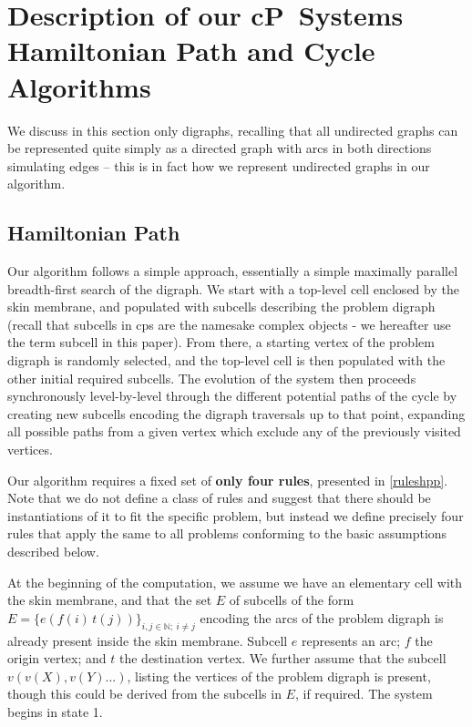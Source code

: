 \section{\label{sect:algohpp}Description of our cP~Systems Hamiltonian Path and Cycle Algorithms}
We discuss in this section only digraphs, recalling that all undirected graphs can be represented quite simply as a directed graph with arcs in both directions simulating edges -- this is in fact how we represent undirected graphs in our algorithm.

\subsection{Hamiltonian Path}
Our algorithm follows a simple approach, essentially a simple maximally parallel breadth-first search of the digraph.  We start with a top-level cell enclosed by the skin membrane, and populated with subcells describing the problem digraph (recall that subcells in \gls{cps} are the namesake complex objects - we hereafter use the term subcell in this paper).  From there, a starting vertex of the problem digraph is randomly selected, and the top-level cell is then populated with the other initial required subcells.  The evolution of the system then proceeds synchronously level-by-level through the different potential paths of the cycle by creating new subcells encoding the digraph traversals up to that point, expanding all possible paths from a given vertex which exclude any of the previously visited vertices.

Our algorithm requires a fixed set of \textbf{only four rules}, presented in \autoref{ruleshpp}.  Note that we do not define a class of rules and suggest that there should be instantiations of it to fit the specific problem, but instead we define precisely four rules that apply the same to all problems conforming to the basic assumptions described below.

At the beginning of the computation, we assume we have an elementary cell with the skin membrane, and that the set \(E\) of subcells of the form \(E = \{e(f(i)\,t(j))\}_{i,j \in \mathbb{N}; ~ i \neq j}\) encoding the arcs of the problem digraph is already present inside the skin membrane.  Subcell \(e\) represents an arc; \(f\) the origin vertex; and \(t\) the destination vertex.  We further assume that the subcell \( v(v(X),v(Y)...)\), listing the vertices of the problem digraph is present, though this could be derived from the subcells in \(E\), if required.  The system begins in state 1.

